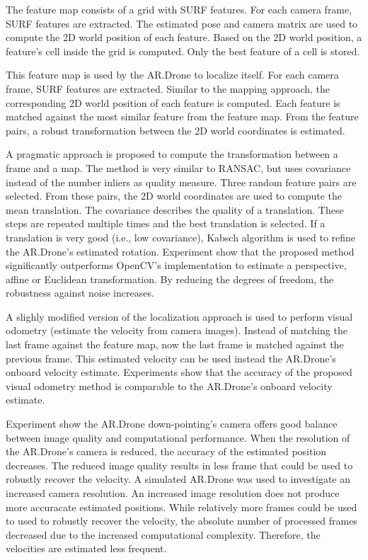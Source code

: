 The feature map consists of a grid with SURF features.
For each camera frame, SURF features are extracted.
The estimated pose and camera matrix are used to compute the 2D world position of each feature.
Based on the 2D world position, a feature's cell inside the grid is computed.
Only the best feature of a cell is stored.

This feature map is used by the AR.Drone to localize itself.
For each camera frame, SURF features are extracted.
Similar to the mapping approach, the corresponding 2D world position of each feature is computed.
Each feature is matched against the most similar feature from the feature map.
From the feature pairs, a robust transformation between the 2D world coordinates is estimated.

A pragmatic approach is proposed to compute the transformation between a frame and a map.
The method is very similar to RANSAC, but uses covariance instead of the number inliers as quality measure.
Three random feature pairs are selected.
From these pairs, the 2D world coordinates are used to compute the mean translation.
The covariance describes the quality of a translation.
These steps are repeated multiple times and the best translation is selected.
If a translation is very good (i.e., low covariance), Kabsch algorithm is used to refine the AR.Drone's estimated rotation.
Experiment show that the proposed method significantly outperforms OpenCV's implementation to estimate a perspective, affine or Euclidean transformation.
By reducing the degrees of freedom, the robustness against noise increases.

A slighly modified version of the localization approach is used to perform visual odometry (estimate the velocity from camera images).
Instead of matching the last frame against the feature map, now the last frame is matched against the previous frame.
This estimated velocity can be used instead 
 the AR.Drone's onboard velocity estimate.
Experiments show that the accuracy of the proposed visual odometry method is comparable to the AR.Drone's onboard velocity estimate.

Experiment show the AR.Drone down-pointing's camera offers good balance between image quality and computational performance.
When the resolution of the AR.Drone's camera is reduced, the accuracy of the estimated position decreases.
The reduced image quality results in less frame that could be used to robustly recover the velocity.
A simulated AR.Drone was used to investigate an increased camera resolution.
An increased image resolution does not produce more accuracate estimated positions.
While relatively more frames could be used to used to robustly recover the velocity, the absolute number of processed frames decreased due to the increased computational complexity.
Therefore, the velocities are estimated less frequent.

